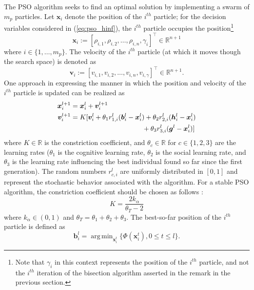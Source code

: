 \documentclass[letterpaper, 10 pt, conference]{ieeeconf}  %
\DeclareMathOperator*{\argmin}{arg\,min}
\begin{document}
The PSO algorithm seeks to find an optimal solution by implementing a swarm of $m_p$ particles. Let $\bm{x}_i$ denote the position of the $i^{th}$ particle; for the decision variables considered in (\ref{eq:pso_hinf}), the $i^{th}$ particle occupies the position\footnote{Note that $\gamma_i$ in this context represents the position of the $i^{th}$ particle, and not the $i^{th}$ iteration of the bisection algorithm asserted in the remark in the previous section.}
\begin{equation}
\bm{x}_i := [\rho_{i,1},\rho_{i,2},\ldots,\rho_{i,n},\gamma_i]^{\top} \in \mathbb{R}^{n+1} 
\end{equation}
where $i \in \{1,\ldots,m_p \}$. The velocity of the $i^{th}$ particle (at which it moves though the search space) is denoted as
\begin{equation}
\bm{v}_i := [v_{i,1},v_{i,2},\ldots,v_{i,n},v_{i,\gamma}]^{\top} \in \mathbb{R}^{n+1}. 
\end{equation}
One approach in expressing the manner in which the position and velocity of the $i^{th}$ particle is updated can be realized as
\begin{equation} \label{eq:update}
\begin{aligned}
\bm{x}_i^{l+1} &= \bm{x}_i^{l} + \bm{v}_i^{l+1} \\
\bm{v}_i^{l+1} &= K [ \bm{v}_i^l + \theta_1 r_{1,i}^l(\bm{b}_i^l-\bm{x}_i^l) + \theta_2 r_{2,i}^l(\bm{h}_i^l-\bm{x}_i^l) \\
& \hspace{3.7cm}+ \theta_3 r_{3,i}^l(\bm{g}^l-\bm{x}_i^l) ]
\end{aligned}
\end{equation}
where $K \in \mathbb{R}$ is the constriction coefficient, and $\theta_c \in \mathbb{R}$ for $c \in \{1,2,3 \}$ are the learning rates ($\theta_1$ is the cognitive learning rate, $\theta_2$ is the social learning rate, and $\theta_3$ is the learning rate influencing the best individual found so far since the first generation). The random numbers $r_{c,i}^l$ are uniformly distributed in $[0, 1]$ and represent the stochastic behavior associated with the algorithm. For a stable PSO algorithm, the constriction coefficient should be chosen as follows \cite{Sim13}: 
\begin{equation}
K = \frac{2 k_\alpha}{\theta_T-2}
\end{equation}
where $k_\alpha \in (0,1)$ and $\theta_T = \theta_1 + \theta_2 +\theta_3$. The best-so-far position of the $i^{th}$ particle is defined as
\begin{equation}
\bm{b}_i^l = \argmin_{ \bm{x}_i^t} \{\Phi(\bm{x}_i^t),0\leq t \leq l \}.
\end{equation}
\end{document}
